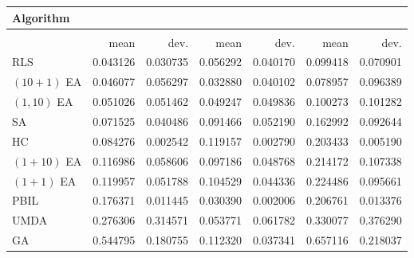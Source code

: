 \begin{tabular}{@{} l *{6}{>{{}}N{1}{2}} @{}}
\toprule
{Algorithm} &  \\
\midrule
&  &  &  \\
\midrule
& {mean} & {dev.} & {mean} & {dev.} & {mean} & {dev.} \\
\midrule
RLS & 0.043126 & 0.030735 & 0.056292 & 0.040170 & 0.099418 & 0.070901 \\
$(10+1)$ EA & 0.046077 & 0.056297 & 0.032880 & 0.040102 & 0.078957 & 0.096389 \\
$(1,10)$ EA & 0.051026 & 0.051462 & 0.049247 & 0.049836 & 0.100273 & 0.101282 \\
SA & 0.071525 & 0.040486 & 0.091466 & 0.052190 & 0.162992 & 0.092644 \\
HC & 0.084276 & 0.002542 & 0.119157 & 0.002790 & 0.203433 & 0.005190 \\
$(1+10)$ EA & 0.116986 & 0.058606 & 0.097186 & 0.048768 & 0.214172 & 0.107338 \\
$(1+1)$ EA & 0.119957 & 0.051788 & 0.104529 & 0.044336 & 0.224486 & 0.095661 \\
PBIL & 0.176371 & 0.011445 & 0.030390 & 0.002006 & 0.206761 & 0.013376 \\
UMDA & 0.276306 & 0.314571 & 0.053771 & 0.061782 & 0.330077 & 0.376290 \\
GA & 0.544795 & 0.180755 & 0.112320 & 0.037341 & 0.657116 & 0.218037 \\
\bottomrule
\end{tabular}
